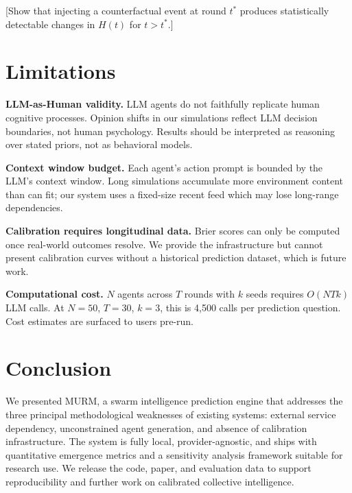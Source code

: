 \documentclass[10pt,twocolumn]{article}
\begin{document}
[Show that injecting a counterfactual event at round $t^*$ produces statistically detectable changes in $H(t)$ for $t > t^*$.]

\section{Limitations}

\textbf{LLM-as-Human validity.} LLM agents do not faithfully replicate human cognitive processes. Opinion shifts in our simulations reflect LLM decision boundaries, not human psychology. Results should be interpreted as reasoning over stated priors, not as behavioral models.

\textbf{Context window budget.} Each agent's action prompt is bounded by the LLM's context window. Long simulations accumulate more environment content than can fit; our system uses a fixed-size recent feed which may lose long-range dependencies.

\textbf{Calibration requires longitudinal data.} Brier scores can only be computed once real-world outcomes resolve. We provide the infrastructure but cannot present calibration curves without a historical prediction dataset, which is future work.

\textbf{Computational cost.} $N$ agents across $T$ rounds with $k$ seeds requires $O(NTk)$ LLM calls. At $N=50$, $T=30$, $k=3$, this is 4,500 calls per prediction question. Cost estimates are surfaced to users pre-run.

\section{Conclusion}

We presented \textsc{MURM}, a swarm intelligence prediction engine that addresses the three principal methodological weaknesses of existing systems: external service dependency, unconstrained agent generation, and absence of calibration infrastructure. The system is fully local, provider-agnostic, and ships with quantitative emergence metrics and a sensitivity analysis framework suitable for research use. We release the code, paper, and evaluation data to support reproducibility and further work on calibrated collective intelligence.



\end{document}
